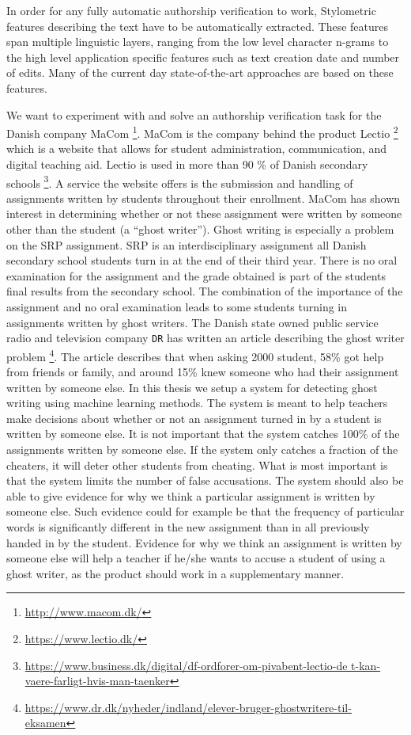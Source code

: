 In order for any fully automatic authorship verification to work, Stylometric
features describing the text have to be automatically extracted. These features
span multiple linguistic layers, ranging from the low level character n-grams
to the high level application specific features such as text creation date and
number of edits. Many of the current day state-of-the-art approaches are based
on these features.


We want to experiment with and solve an authorship verification task for the
Danish company MaCom \footnote{\url{http://www.macom.dk/}}. MaCom is the company
behind the product Lectio \footnote{\url{https://www.lectio.dk/}} which is a
website that allows for student administration, communication, and digital
teaching aid. Lectio is used in more than 90 \% of Danish secondary schools
\footnote{\url{https://www.business.dk/digital/df-ordforer-om-pivabent-lectio-de
t-kan-vaere-farligt-hvis-man-taenker}}. A service the website offers is the
submission and handling of assignments written by students throughout their
enrollment. MaCom has shown interest in determining whether or not these
assignment were written by someone other than the student (a ``ghost writer'').
Ghost writing is especially a problem on the \gls{SRP} assignment. \gls{SRP}
is an interdisciplinary assignment all Danish secondary school students turn
in at the end of their third year. There is no oral examination for the
assignment and the grade obtained is part of the students final results from
the secondary school. The combination of the importance of the assignment and
no oral examination leads to some students turning in assignments written by
ghost writers. The Danish state owned public service radio and television
company \texttt{DR} has written an article describing the ghost writer problem
\footnote{\url{https://www.dr.dk/nyheder/indland/elever-bruger-ghostwritere-til-
eksamen}}. The article describes that when asking 2000 student, 58\% got help
from friends or family, and around 15\% knew someone who had their assignment
written by someone else. In this thesis we setup a system for detecting ghost
writing using machine learning methods. The system is meant to help teachers
make decisions about whether or not an assignment turned in by a student is
written by someone else. It is not important that the system catches 100\% of
the assignments written by someone else. If the system only catches a fraction
of the cheaters, it will deter other students from cheating. What is most
important is that the system limits the number of false accusations. The system
should also be able to give evidence for why we think a particular assignment is
written by someone else. Such evidence could for example be that the frequency
of particular words is significantly different in the new assignment than in all
previously handed in by the student. Evidence for why we think an assignment is
written by someone else will help a teacher if he/she wants to accuse a student
of using a ghost writer, as the product should work in a supplementary manner.


